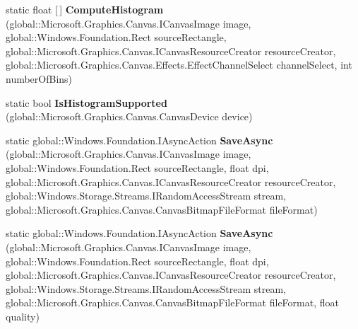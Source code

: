 \begin{DoxyCompactItemize}
\mbox{\label{class_microsoft_1_1_graphics_1_1_canvas_1_1_canvas_image_ac93dfecc525eae062c86e25f3af30682}} 
static float \mbox{[}$\,$\mbox{]} {\bfseries Compute\+Histogram} (global\+::\+Microsoft.\+Graphics.\+Canvas.\+I\+Canvas\+Image image, global\+::\+Windows.\+Foundation.\+Rect source\+Rectangle, global\+::\+Microsoft.\+Graphics.\+Canvas.\+I\+Canvas\+Resource\+Creator resource\+Creator, global\+::\+Microsoft.\+Graphics.\+Canvas.\+Effects.\+Effect\+Channel\+Select channel\+Select, int number\+Of\+Bins)
\item 
\mbox{\label{class_microsoft_1_1_graphics_1_1_canvas_1_1_canvas_image_aff3e5210428f12ae587c08a1c3b26c85}} 
static bool {\bfseries Is\+Histogram\+Supported} (global\+::\+Microsoft.\+Graphics.\+Canvas.\+Canvas\+Device device)
\item 
\mbox{\label{class_microsoft_1_1_graphics_1_1_canvas_1_1_canvas_image_a30ada8b24e212bcbdc24f994e66ad191}} 
static global\+::\+Windows.\+Foundation.\+I\+Async\+Action {\bfseries Save\+Async} (global\+::\+Microsoft.\+Graphics.\+Canvas.\+I\+Canvas\+Image image, global\+::\+Windows.\+Foundation.\+Rect source\+Rectangle, float dpi, global\+::\+Microsoft.\+Graphics.\+Canvas.\+I\+Canvas\+Resource\+Creator resource\+Creator, global\+::\+Windows.\+Storage.\+Streams.\+I\+Random\+Access\+Stream stream, global\+::\+Microsoft.\+Graphics.\+Canvas.\+Canvas\+Bitmap\+File\+Format file\+Format)
\item 
\mbox{\label{class_microsoft_1_1_graphics_1_1_canvas_1_1_canvas_image_a84ddbc832a47bc0660a10d09a095ae1e}} 
static global\+::\+Windows.\+Foundation.\+I\+Async\+Action {\bfseries Save\+Async} (global\+::\+Microsoft.\+Graphics.\+Canvas.\+I\+Canvas\+Image image, global\+::\+Windows.\+Foundation.\+Rect source\+Rectangle, float dpi, global\+::\+Microsoft.\+Graphics.\+Canvas.\+I\+Canvas\+Resource\+Creator resource\+Creator, global\+::\+Windows.\+Storage.\+Streams.\+I\+Random\+Access\+Stream stream, global\+::\+Microsoft.\+Graphics.\+Canvas.\+Canvas\+Bitmap\+File\+Format file\+Format, float quality)
\item 
\mbox{\label{class_microsoft_1_1_graphics_1_1_canvas_1_1_canvas_image_a762e42f02f39504e92616098985cf683}} 

\end{DoxyCompactItemize}

